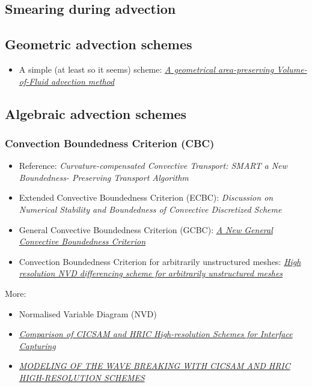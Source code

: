 \documentclass[]{report}
\begin{document}
\subsection{Smearing during advection}

\subsection{Geometric advection schemes}

\begin{itemize}
    \item A simple (at least so it seems) scheme: \textit{\href{http://www.lmm.jussieu.fr/~zaleski/nota02.pdf}{A geometrical area-preserving Volume-of-Fluid advection method}}
\end{itemize}

\subsection{Algebraic advection schemes}

\subsubsection{Convection Boundedness Criterion (CBC)}

\sloppy
\begin{itemize}
    \item Reference: \textit{Curvature-compensated Convective Transport: SMART a New Boundedness- Preserving Transport Algorithm}
    \item Extended Convective Boundedness Criterion (ECBC): \textit{Discussion on Numerical Stability and Boundedness of Convective Discretized Scheme}
    \item General Convective Boundedness Criterion (GCBC): \textit{\href{http://gr.xjtu.edu.cn:8080/upload/PUB.1673.4/Wei_NHT.pdf}{A New General Convective Boundedness Criterion}}
    \item Convection Boundedness Criterion for arbitrarily unstructured meshes: \textit{\href{http://powerlab.fsb.hr/ped/kturbo/openfoam/papers/GammaPaper.pdf}{High resolution NVD differencing scheme for arbitrarily unstructured meshes}}
\end{itemize}
\fussy

More:
\begin{itemize}
    \item Normalised Variable Diagram (NVD)
    \item \textit{\href{http://warminski.pollub.plwww.ptmts.org.pl/Waclaw-Koron-2-08.pdf}{Comparison of CICSAM and HRIC High-resolution Schemes for Interface Capturing}}
    \item \textit{\href{http://proceedings.fyper.com/eccomascfd2006/documents/85.pdf}{MODELING OF THE WAVE BREAKING WITH CICSAM AND HRIC HIGH-RESOLUTION SCHEMES}}
\end{itemize}
\end{document}
